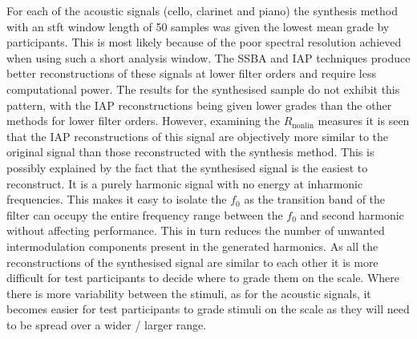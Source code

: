 		For each of the acoustic signals (cello, clarinet and piano) the synthesis method with an \acrshort{stft}
		window length of 50 samples was given the lowest mean grade by participants. This is most likely because of
		the poor spectral resolution achieved when using such a short analysis window. The SSBA and IAP techniques
		produce better reconstructions of these signals at lower filter orders and require less computational
		power. The results for the synthesised sample do not exhibit this pattern, with the IAP reconstructions
		being given lower grades than the other methods for lower filter orders. However, examining the
		$R_{\mathrm{nonlin}}$ measures it is seen that the IAP reconstructions of this signal are objectively more
		similar to the original signal than those reconstructed with the synthesis method. This is possibly
		explained by the fact that the synthesised signal is the easiest to reconstruct. It is a purely harmonic
		signal with no energy at inharmonic frequencies. This makes it easy to isolate the $f_{0}$ as the
		transition band of the filter can occupy the entire frequency range between the $f_{0}$ and second harmonic
		without affecting performance. This in turn reduces the number of unwanted intermodulation components
		present in the generated harmonics. As all the reconstructions of the synthesised signal are similar to
		each other it is more difficult for test participants to decide where to grade them on the scale. Where
		there is more variability between the stimuli, as for the acoustic signals, it becomes easier for test
		participants to grade stimuli on the scale as they will need to be spread over a wider / larger range.


